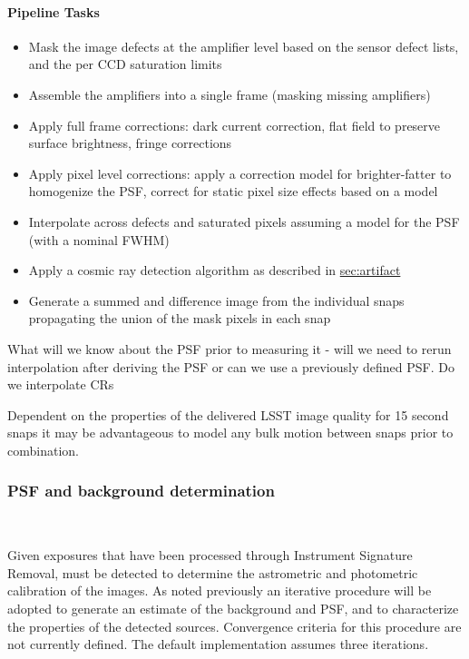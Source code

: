 \paragraph{Pipeline Tasks}
\begin{itemize}
\item Mask the image defects at the amplifier level based on the sensor defect lists, and the per CCD saturation limits
\item Assemble the amplifiers into a single frame (masking missing amplifiers)
\item Apply full frame corrections: dark current correction, flat field to preserve surface brightness, fringe corrections
\item Apply pixel level corrections: apply a correction model for brighter-fatter to homogenize the PSF, correct for static pixel size effects based on a model
\item Interpolate across defects and saturated pixels assuming a model for the PSF (with a nominal FWHM)
\item Apply a cosmic ray detection algorithm as described in \hyperref[sec:artifact]{sec:artifact}
\item Generate a summed and difference image from the individual snaps propagating the union of the mask pixels in each snap
\end{itemize}

\begin{note} What will we know about the PSF prior to measuring it - will we need to rerun interpolation after deriving the PSF or can we use a previously defined PSF. Do we interpolate CRs \end{note}

Dependent on the properties of the delivered LSST image quality for 15 second snaps it may be advantageous to model any bulk motion between snaps prior to combination.


\subsubsection{PSF and background determination}~
\label{sec:apPSFBackground}

Given exposures that have been processed through Instrument Signature Removal, \Sources must be detected to determine the astrometric and photometric calibration of the images. As noted previously an iterative procedure will be adopted to generate an estimate of the background and PSF, and to characterize the properties of the detected sources.  Convergence criteria for this procedure are not currently defined. The default implementation assumes three iterations.

